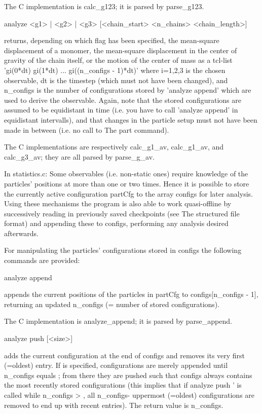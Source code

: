 {The C implementation is calc\_g123; it is parsed by parse\_g123.

\begin{tclcode}
 analyze { <g1> | <g2> | <g3> } [<chain_start> <n_chains> <chain_length>] 
\end{tclcode}
returns, depending on which flag has been specified, the mean-square displacement  of a monomer, the mean-square displacement  in the center of gravity of the chain itself, or the motion of the center of mass  as a tcl-list 'gi(0*dt) gi(1*dt) ... gi((n\_configs - 1)*dt)' where i=1,2,3 is the chosen observable, dt is the timestep (which must not have been changed), and n\_configs is the number of configurations stored by 'analyze append' which are used to derive the observable.
Again, note that the stored configurations are assumed to be equidistant in time (i.e. you have to call 'analyze append' in equidistant intervalls), and that changes in the particle setup must not have been made in between (i.e. no call to The part command).

The C implementations are respectively calc\_g1\_av, calc\_g1\_av, and calc\_g3\_av; they are all parsed by parse\_g\_av.

In statistics.c:
Some observables (i.e. non-static ones) require knowledge of the particles' positions at more than one or two times. Hence it is possible to store the currently active configuration partCfg to the array configs for later analysis. Using these mechanisms the program is also able to work quasi-offline by successively reading in previously saved checkpoints (see The structured file format) and appending these to configs, performing any analysis desired afterwards.

For manipulating the particles' configurations stored in configs the following commands are provided:

\begin{tclcode}
 analyze append 
\end{tclcode}
appends the current positions of the particles in partCfg to configs[n\_configs - 1], returning an updated n\_configs (= number of stored configurations).

The C implementation is analyze\_append; it is parsed by parse\_append.

\begin{tclcode}
 analyze push [<size>] 
\end{tclcode}
adds the current configuration at the end of configs and removes its very first (=oldest) entry.
If  is specified, configurations are merely appended until n\_configs equals ; from there they are pushed such that configs always contains the  most recently stored configurations (this implies that if analyze push ' is called while n\_configs > , all n\_configs- uppermost (=oldest) configurations are removed to end up with  recent entries).
The return value is n\_configs.

}
